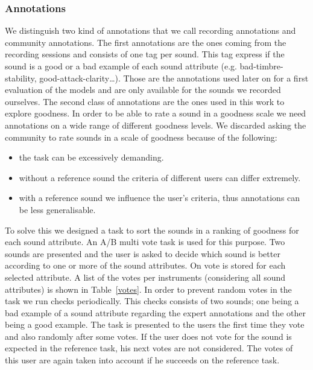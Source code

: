 \documentclass{article}
\begin{document}
\subsubsection{Annotations}
We distinguish two kind of annotations that we call recording annotations and community annotations. The first annotations are the ones coming from the recording sessions and consists of one tag per sound. This tag express if the sound is a good or a bad example of each sound attribute (e.g. bad-timbre-stability, good-attack-clarity…). Those are the annotations used later on for a first evaluation of the models and are only available for the sounds we recorded ourselves.
The second class of annotations are the ones used in this work to explore goodness. In order to be able to rate a sound in a goodness scale we need annotations on a wide range of different goodness levels. We discarded asking the community to rate sounds in a scale of goodness because of the following:

\begin{itemize}
	\item{the task can be excessively demanding.}
	\item{without a reference sound the criteria of different users can differ extremely.}
	\item{with a reference sound we influence the user’s criteria, thus annotations can be less 	generalisable.}
\end{itemize}

To solve this we designed a task to sort the sounds in a ranking of goodness for each sound attribute. An A/B multi vote task is used for this purpose. Two sounds are presented and the user is asked to decide which sound is better according to one or more of the sound attributes. On vote is stored for each selected attribute. A list of the votes per instruments (considering all sound attributes) is shown in Table~\ref{votes}.
In order to prevent random votes in the task we run checks periodically. This checks consists of two sounds; one being a bad example of a sound attribute regarding the expert annotations and the other being a good example. The task is presented to the users the first time they vote and also randomly after some votes. If the user does not vote for the sound is expected in the reference task, his next votes are not considered. The votes of this user are again taken into account if he succeeds on the reference task. 
\end{document}

